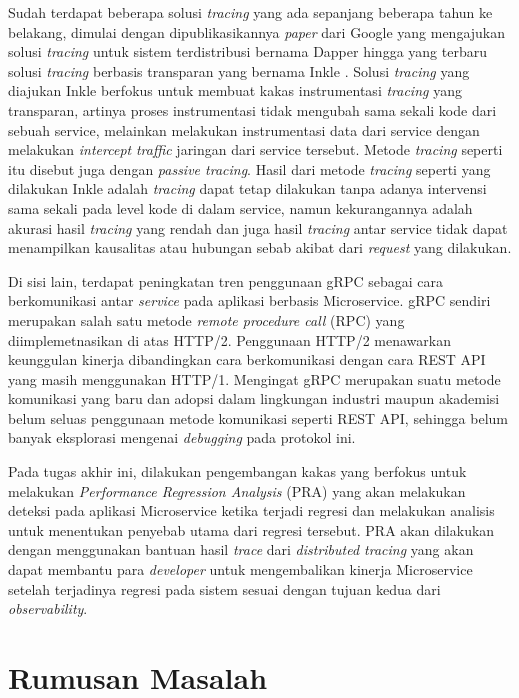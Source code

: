  Sudah terdapat beberapa solusi \textit{tracing} yang ada sepanjang beberapa tahun ke belakang, dimulai dengan dipublikasikannya \textit{paper} dari Google yang mengajukan solusi \textit{tracing} untuk sistem terdistribusi bernama Dapper \citep{dapper-paper} hingga yang terbaru solusi \textit{tracing} berbasis transparan yang bernama Inkle \citep{tracing-abram}. Solusi \textit{tracing} yang diajukan Inkle berfokus untuk membuat kakas instrumentasi \textit{tracing} yang transparan, artinya proses instrumentasi tidak mengubah sama sekali kode dari sebuah service, melainkan melakukan instrumentasi data dari service dengan melakukan \textit{intercept} \textit{traffic} jaringan dari service tersebut. Metode \textit{tracing} seperti itu disebut juga dengan \textit{passive tracing}. Hasil dari metode \textit{tracing} seperti yang dilakukan Inkle adalah \textit{tracing} dapat tetap dilakukan tanpa adanya intervensi sama sekali pada level kode di dalam service, namun kekurangannya adalah akurasi hasil \textit{tracing} yang rendah dan juga hasil \textit{tracing} antar service tidak dapat menampilkan kausalitas atau hubungan sebab akibat dari \textit{request} yang dilakukan.

Di sisi lain, terdapat peningkatan tren penggunaan gRPC \citep{grpc} sebagai cara berkomunikasi antar \textit{service} pada aplikasi berbasis Microservice.  gRPC sendiri merupakan salah satu metode \textit{remote procedure call} (RPC) yang diimplemetnasikan di atas HTTP/2. Penggunaan HTTP/2 menawarkan keunggulan kinerja dibandingkan cara berkomunikasi dengan cara REST API yang masih menggunakan HTTP/1. Mengingat gRPC merupakan suatu metode komunikasi yang baru dan adopsi dalam lingkungan industri maupun akademisi belum seluas penggunaan metode komunikasi seperti REST API, sehingga belum banyak eksplorasi mengenai \textit{debugging} pada protokol ini.
  
Pada tugas akhir ini, dilakukan pengembangan kakas yang berfokus untuk melakukan \textit{Performance Regression Analysis} (PRA) yang akan melakukan deteksi pada aplikasi Microservice ketika terjadi regresi dan melakukan analisis untuk menentukan penyebab utama dari regresi tersebut. PRA akan dilakukan dengan menggunakan bantuan hasil \textit{trace} dari \textit{distributed tracing} yang akan dapat membantu para \textit{developer} untuk mengembalikan kinerja Microservice setelah terjadinya regresi pada sistem sesuai dengan tujuan kedua dari \textit{observability}. 

\section{Rumusan Masalah}\label{RumusanMasalah}

